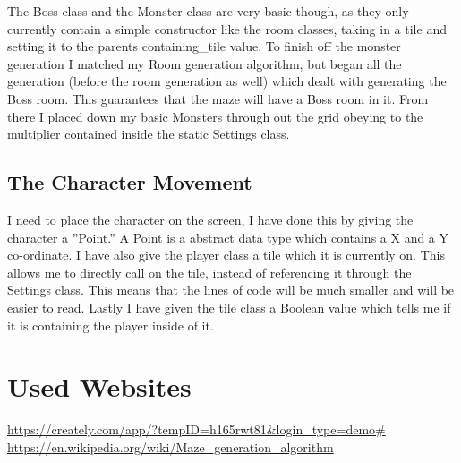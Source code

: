 \documentclass[12pt]{article}
\begin{document}
The Boss class and the Monster class are very basic though, as they only currently contain a simple constructor like the room classes, taking in a tile and setting it to the parents containing\_tile value. To finish off the monster generation I matched my Room generation algorithm, but began all the generation (before the room generation as well) which dealt with generating the Boss room. This guarantees that the maze will have a Boss room in it. From there I placed down my basic Monsters through out the grid obeying to the multiplier contained inside the static Settings class.

\subsection{The Character Movement}

I need to place the character on the screen, I have done this by giving the character a ''Point.'' A Point is a abstract data type which contains a X and a Y co-ordinate. I have also give the player class a tile which it is currently on. This allows me to directly call on the tile, instead of referencing it through the Settings class. This means that the lines of code will be much smaller and will be easier to read. Lastly I have given the tile class a Boolean value which tells me if it is containing the player inside of it. 


\section{Used Websites}






























\url{https://creately.com/app/?tempID=h165rwt81&login_type=demo#}\newline
\url{https://en.wikipedia.org/wiki/Maze_generation_algorithm}
\end{document}
